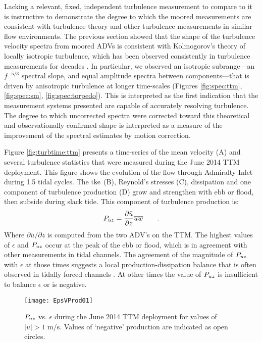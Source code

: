 Lacking a relevant, fixed, independent turbulence measurement to compare to it is instructive to demonstrate the degree to which the moored measurements are consistent with turbulence theory and other turbulence measurements in similar flow environments. The previous section showed that the shape of the turbulence velocity spectra from moored ADVs is consistent with Kolmogorov's theory of locally isotropic turbulence, which has been observed consistently in turbulence measurements for decades \citep[]{Kolmogorov1941c,Grant++1962,McMillan++2016}. In particular, we observed an isotropic subrange---an $f^{-5/3}$ spectral slope, and equal amplitude spectra between components---that is driven by anisotropic turbulence at longer time-scales (Figures \ref{fig:spec:ttm}, \ref{fig:spec:sm}, \ref{fig:spec:torpedo}). This is interpreted as the first indication that the measurement systems presented are capable of accurately resolving turbulence. The degree to which uncorrected spectra were corrected toward this theoretical and observationally confirmed shape is interpreted as a measure of the improvement of the spectral estimates by motion correction.

Figure \ref{fig:turbtime:ttm} presents a time-series of the mean velocity (A) and several turbulence statistics that were measured during the June 2014 TTM deployment. This figure shows the evolution of the flow through Admiralty Inlet during 1.5 tidal cycles. The $\mathrm{tke}$ (B), Reynold's stresses (C), dissipation and one component of turbulence production (D) grow and strengthen with ebb or flood, then subside during slack tide.  This component of turbulence production is:
\begin{align}
  P_{uz} = \frac{\partial \bar{u}}{\partial z}\overline{uw} \qquad .
\end{align}
Where $\partial \bar{u}/\partial z$ is computed from the two ADV's on the TTM. The highest values of $\epsilon$ and $P_{uz}$ occur at the peak of the ebb or flood, which is in agreement with other measurements in tidal channels. The agreement of the magnitude of $P_{uz}$ with $\epsilon$ at those times suggests a local production-dissipation balance that is often observed in tidally forced channels \citep[]{Trowbridge++1999,Stacey++1999,McMillan++2016}. At other times the value of $P_{uz}$ is insufficient to balance $\epsilon$ or is negative.

\begin{figure}[t]
  \centering
  \texttt{[image: EpsVProd01]}
  \caption{$P_{uz}$ vs. $\epsilon$ during the June 2014 TTM deployment for values of $|u|>1$ m/s. Values of `negative' production are indicated as open circles. }
  \label{fig:prodVeps}
\end{figure}

